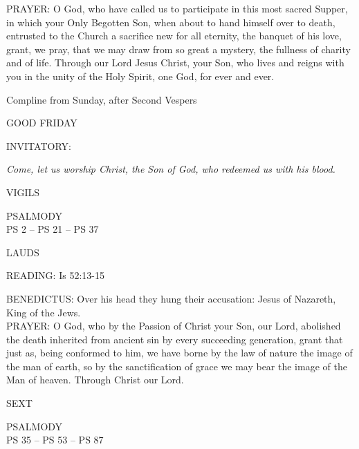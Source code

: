 \noindent\small{\uppercase{PRAYER:}}	O God, who have called us to participate in this most sacred Supper, in which your Only Begotten Son, when about to hand himself over to death, entrusted to the Church a sacrifice new for all eternity, the banquet of his love, grant, we pray, that we may draw from so great a mystery, the fullness of charity and of life. Through our Lord Jesus Christ, your Son, who lives and reigns with you in the unity of the Holy Spirit, one God, for ever and ever.

Compline from Sunday, after Second Vespers

	\begin{center}
\normalsize GOOD FRIDAY
	\end{center}

\small{\uppercase{INVITATORY:}}\normalsize
\begin{center}
\textit{Come, let us worship Christ, the Son of God, who redeemed us with his blood.\\}
\end{center}
\begin{flushleft}\normalsize{\uppercase{VIGILS\\}}\end{flushleft}
\noindent\small{\uppercase{PSALMODY}\\}
\uppercase{Ps 2 -- Ps 21 -- Ps 37}\vspace{0.5em}\\

\begin{flushleft}\normalsize{\uppercase{LAUDS\\}}\end{flushleft}
\noindent\small{\uppercase{READING:}}    Is 52:13-15 \textbf{   \\}

\noindent\small{\uppercase{BENEDICTUS:}}	Over his head they hung their accusation: Jesus of Nazareth, King of the Jews.\\

\noindent\small{\uppercase{PRAYER:}}	O God, who by the Passion of Christ your Son, our Lord, abolished the death inherited from ancient sin by every succeeding generation, grant that just as, being conformed to him, we have borne by the law of nature the image of the man of earth, so by the sanctification of grace we may bear the image of the Man of heaven. Through Christ our Lord.

\begin{flushleft}\normalsize{\uppercase{SEXT\\}}\end{flushleft}
\noindent\small{\uppercase{PSALMODY}\\}
\uppercase{Ps 35 -- Ps 53 -- Ps 87}\vspace{0.5em}\\

